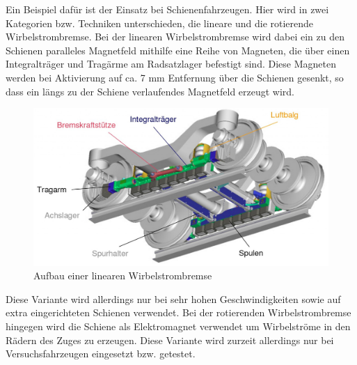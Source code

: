 Ein Beispiel dafür ist der Einsatz bei Schienenfahrzeugen. Hier wird in zwei
Kategorien bzw. Techniken unterschieden, die lineare und die rotierende Wirbelstrombremse.
Bei der linearen Wirbelstrombremse wird dabei ein zu den Schienen paralleles
Magnetfeld mithilfe eine Reihe von Magneten, die über einen Integralträger und
Tragärme am Radsatzlager befestigt sind. Diese Magneten werden bei Aktivierung
auf ca. 7 mm Entfernung über die Schienen gesenkt, so dass ein längs zu der Schiene
verlaufendes Magnetfeld erzeugt wird.

\begin{figure}
  \includegraphics[width=\textwidth]{Wirbelstrombremse_Aufbau.jpg}
  \caption{Aufbau einer linearen Wirbelstrombremse}
  \label{fig:linWAufbau}
\end{figure}

Diese Variante
wird allerdings nur bei sehr hohen Geschwindigkeiten sowie auf extra eingerichteten
Schienen verwendet.
Bei der rotierenden Wirbelstrombremse hingegen wird die Schiene als Elektromagnet
verwendet um Wirbelströme in den Rädern des Zuges zu erzeugen. Diese Variante wird
zurzeit allerdings nur bei Versuchsfahrzeugen eingesetzt bzw. getestet.



